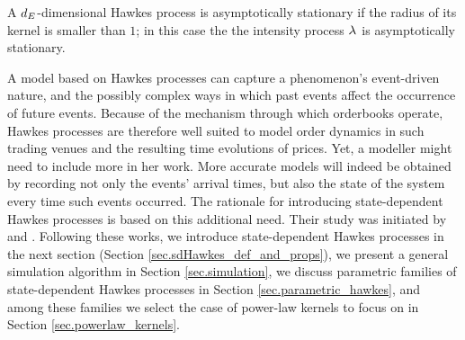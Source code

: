 \documentclass[10pt, article,table]{article}
\begin{document}
A $\numEventTypes$-dimensional Hawkes process is asymptotically stationary if the radius of its kernel is smaller than $1$; in this case the the intensity process $\intensity[ ]$ is asymptotically stationary.  

A model based on Hawkes processes can capture a phenomenon's event-driven nature, and the possibly complex ways in which past events affect the occurrence of future events. Because of the mechanism through which orderbooks operate, Hawkes processes are therefore well suited to model order dynamics in such trading venues and the resulting time evolutions of prices. Yet, a modeller might need to include more in her work. More accurate models will indeed be obtained by recording not only the events' arrival times, but also the state of the system every time such events occurred. The rationale for introducing state-dependent Hawkes processes is based on this additional need. Their study was initiated by \citealp{MP20hyb} and \citealp{MP18sta}. Following these works, we introduce state-dependent Hawkes  processes in the next section (Section \ref{sec.sdHawkes_def_and_props}), we present a general simulation algorithm in Section \ref{sec.simulation},  we discuss parametric families of state-dependent Hawkes processes in Section \ref{sec.parametric_hawkes}, and among these families we select the case of power-law kernels to focus on in Section \ref{sec.powerlaw_kernels}.
\end{document}
